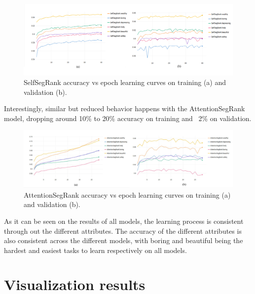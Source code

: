 \begin{figure}[ht]
	\begin{center}
	\includegraphics[width=1\textwidth]{./figures/selfsegrank_graph.png}
	\caption[SelfSegRank Training curves]{
        SelfSegRank accuracy vs epoch learning curves on training (a) and validation (b).
        }
	\label{fig:selfsegrank_graph}
	\end{center}
\end{figure}

Interestingly, similar but reduced behavior happens with the AttentionSegRank model,
dropping around 10\% to 20\% accuracy on training and ~2\% on validation.

\begin{figure}[ht]
	\begin{center}
	\includegraphics[width=1\textwidth]{./figures/AttentionSegRank_graph.jpg}
	\caption[AttentionSegRank Training curves]{
        AttentionSegRank accuracy vs epoch learning curves on training (a) and validation (b).
        }
	\label{fig:attentionsegrank_graph}
	\end{center}
\end{figure}



As it can be seen on the results of all models, the learning process is consistent through out
the different attributes. The accuracy of the different attributes is also consistent across the
different models, with boring and beautiful being the hardest and easiest tasks to learn respectively
on all models.


\section{Visualization results}
\label{sec:visualization_results}


